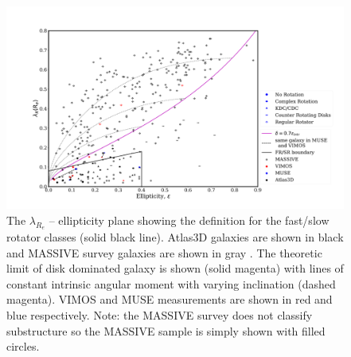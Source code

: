 		\begin{figure}
			\centering
			\includegraphics[width=\textwidth]{chapter4/lambda_R_ellipticity.png}
			\caption[$\lambda_{R_e}$ -- ellipticity plane]{The $\lambda_{R_e}$ -- ellipticity plane showing the definition for the fast/slow rotator classes (solid black line). Atlas3D galaxies are shown in black \citep{Emsellem2011} and MASSIVE survey galaxies are shown in gray \citep{Veale2017}. The theoretic limit of disk dominated galaxy is shown (solid magenta) with lines of constant intrinsic angular moment with varying inclination (dashed magenta). VIMOS and MUSE measurements are shown in red and blue respectively. Note: the MASSIVE survey does not classify substructure so the MASSIVE sample is simply shown with filled circles.}
			\label{fig:lambdaR_ellip}
		\end{figure}


		


